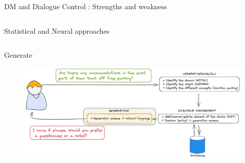 \documentclass[10pt,aspectratio=169]{beamer}
\begin{document}
\begin{frame}{DM and Dialogue Control : Strengths and weakness}
\begin{columns}
\begin{column}{0.5\textwidth}
\begin{block}{Statistical and Neural approaches}
            \end{block}
        \end{column}
    \end{columns}
    
\end{frame}
\begin{frame}{Generate}
      \begin{figure}
        \centering
        \includegraphics[width=1.\textwidth]{media/dialogue_task_complete_gen.png}
    \end{figure}
    
\end{frame}
\end{document}
